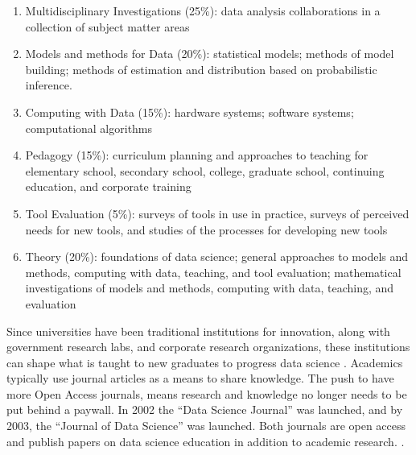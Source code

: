 \documentclass[010-intro.tex]{subfiles}
\begin{document}
    \begin{enumerate}
        \item Multidisciplinary Investigations (25\%):
            data analysis collaborations in a collection of subject matter areas
        \item Models and methods for Data (20\%):
            statistical models;
            methods of model building;
            methods of estimation and distribution based on probabilistic inference.
        \item Computing with Data (15\%):
            hardware systems;
            software systems;
            computational algorithms
        \item Pedagogy (15\%):
            curriculum planning and approaches to teaching for
            elementary school, secondary school, college, graduate school,
            continuing education, and corporate training
        \item Tool Evaluation (5\%):
            surveys of tools in use in practice,
            surveys of perceived needs for new tools,
            and studies of the processes for developing new tools
        \item Theory (20\%):
            foundations of data science;
            general approaches to models and methods, computing with data, teaching, and tool evaluation;
            mathematical investigations of models and methods, computing with data, teaching, and evaluation
    \end{enumerate}

    Since universities have been traditional institutions for innovation,
    along with government research labs,
    and corporate research organizations,
    these institutions can shape what is taught to new graduates to progress data science
    \cite{clevelandDataScienceAction2001}.
    Academics typically use journal articles as a means to share knowledge.
    The push to have more Open Access journals, means research and knowledge no longer needs to be put
    behind a paywall.
    In 2002 the ``Data Science Journal'' was launched,
    and by 2003, the ``Journal of Data Science'' was launched.
    Both journals are open access and publish papers on data science education in addition to academic research.
    \cite{DataScienceJournal, JournalDataScience}.
\end{document}
